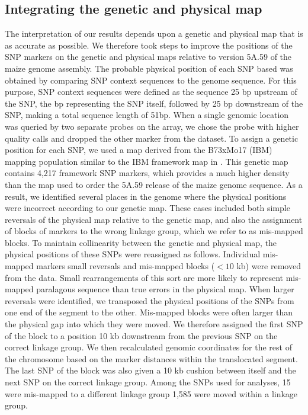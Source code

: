 \documentclass[twocolumn,twoside,letterpaper]{article}
\begin{document}
\subsection*{Integrating the genetic and physical map}
The interpretation of our results depends upon a genetic and physical map that is as accurate as possible. 
We therefore took steps to improve the positions of the SNP markers on the genetic and physical maps relative to version 5A.59 of the maize genome assembly. 
The probable physical position of each SNP based was obtained by comparing SNP context sequences to the genome sequence. 
For this purpose, SNP context sequences were defined as the sequence 25 bp upstream of the SNP, the bp representing the SNP itself, followed by 25 bp downstream of the SNP, making a total sequence length of 51bp. 
When a single genomic location was queried by two separate probes on the array, we chose the probe with higher quality calls and dropped the other marker from the dataset. 
To assign a genetic position for each SNP, we used a map derived from the B73xMo17 (IBM) mapping population similar to the IBM framework map in \citet{ganal2011a-large}. 
This genetic map contains 4,217 framework SNP markers, which provides a much higher density than the map used to order the 5A.59 release of the maize genome sequence. 
As a result, we identified several places in the genome where the physical positions were incorrect according to our genetic map. 
These cases included both simple reversals of the physical map relative to the genetic map, and also the assignment of blocks of markers to the wrong linkage group, which we refer to as mis-mapped blocks. 
To maintain collinearity between the genetic and physical map, the physical positions of these SNPs were reassigned as follows. 
Individual mis-mapped markers small reversals and mis-mapped blocks ($<10$ kb) were removed from the data. 
Small rearrangements of this sort are more likely to represent mis-mapped paralagous sequence than true errors in the physical map. 
When larger reversals were identified, we transposed the physical positions of the SNPs from one end of the segment to the other. 
Mis-mapped blocks were often larger than the physical gap into which they were moved. 
We therefore assigned the first SNP of the block to a position 10 kb downstream from the previous SNP on the correct linkage group. 
We then recalculated genomic coordinates for the rest of the chromosome based on the marker distances within the translocated segment. 
The last SNP of the block was also given a 10 kb cushion between itself and the next SNP on the correct linkage group. 
Among the SNPs used for analyses, 15 were mis-mapped to a different linkage group 1,585 were moved within a linkage group.
\end{document}
